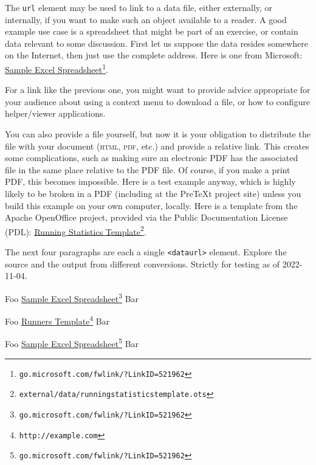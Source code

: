 \documentclass{amsart}
\theoremstyle{plain}%
\theoremstyle{definition}%
\theoremstyle{remark}%
\newcommand{\mono}[1]{\texttt{#1}}
\newcommand{\initialism}[1]{\textsc{\MakeLowercase{#1}}}
\numberwithin{equation}{section}
\begin{document}
The \mono{url} element may be used to link to a data file, either externally, or internally, if you want to make such an object available to a reader.  A good example use case is a spreadsheet that might be part of an exercise, or contain data relevant to some discussion.  First let us suppose the data resides somewhere on the Internet, then just use the complete address.  Here is one from Microsoft: \href{http://go.microsoft.com/fwlink/?LinkID=521962}{Sample Excel Spreadsheet}\footnote{\nolinkurl{go.microsoft.com/fwlink/?LinkID=521962}\label{section-cross-referencing-16-5}}.%
\par
For a link like the previous one, you might want to provide advice appropriate for your audience about using a context menu to download a file, or how to configure helper\slash{}viewer applications.%
\par
You can also provide a file yourself, but now it is your obligation to distribute the file with your document (\initialism{HTML}, \initialism{PDF}, etc.\@) and provide a relative link.  This creates some complications, such as making sure an electronic PDF has the associated file in the same place relative to the PDF file.  Of course, if you make a print PDF, this becomes impossible.  Here is a test example anyway, which is highly likely to be broken in a PDF (including at the PreTeXt project site) unless you build this example on your own computer, locally.  Here is a template from the Apache OpenOffice project, provided via the Public Documentation License (PDL):  \href{external/data/runningstatisticstemplate.ots}{Running Statistics Template}\footnote{\nolinkurl{external/data/runningstatisticstemplate.ots}\label{section-cross-referencing-18-6}}.%
\par
The next four paragraphs are each a single \mono{<dataurl>} element.  Explore the source and the output from different conversions.  Strictly for testing as of 2022-11-04.%
\par
Foo \href{http://go.microsoft.com/fwlink/?LinkID=521962}{Sample Excel Spreadsheet}\footnote{\nolinkurl{go.microsoft.com/fwlink/?LinkID=521962}\label{section-cross-referencing-20-2}} Bar%
\par
Foo \href{https://pretextbook.org/examples/sample-article/html/external/data/runningstatisticstemplate.ots}{Runners Template}\footnote{\nolinkurl{http://example.com}\label{section-cross-referencing-21-2}} Bar%
\par
Foo \href{http://go.microsoft.com/fwlink/?LinkID=521962}{Sample Excel Spreadsheet}\footnote{\nolinkurl{go.microsoft.com/fwlink/?LinkID=521962}\label{section-cross-referencing-22-2}} Bar%
\end{document}
